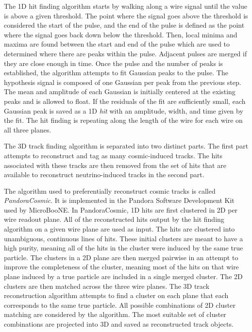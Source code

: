     The 1D hit finding algorithm starts by walking along a wire signal until
    the value is above a given threshold. The point where the signal goes above
    the threshold is considered the start of the pulse, and the end of the
    pulse is defined as the point where the signal goes back down below the
    threshold.  Then, local minima and maxima are found between the start and
    end of the pulse which are used to determined where there are peaks within
    the pulse.  Adjacent pulses are merged if they are close enough in time.
    Once the pulse and the number of peaks is established, the algorithm
    attempts to fit Gaussian peaks to the pulse. The hypothesis signal is
    composed of one Gaussian per peak from the previous step. The mean and
    amplitude of each Gaussian is initially centered at the existing peaks and
    is allowed to float. If the residuals of the fit are sufficiently small,
    each Gaussian peak is saved as a 1D \textit{hit} with an amplitude, width,
    and time given by the fit. The hit finding is repeating along the length of
    the wire for each wire on all three planes.

    The 3D track finding algorithm is separated into two distinct parts. The
    first part attempts to reconstruct and tag as many cosmic-induced tracks.
    The hits associated with these tracks are then removed from the set of hits
    that are available to reconstruct neutrino-induced tracks in the second
    part. 

    The algorithm used to preferentially reconstruct cosmic tracks is called
    \textit{PandoraCosmic}. It is implemented in the Pandora Software
    Development Kit~\cite{Pandora} used by MicroBooNE. In PandoraCosmic, 1D
    hits are first clustered in 2D per wire readout plane. All of the
    reconstructed hits output by the hit finding algorithm on a given wire
    plane are used as input. The hits are clustered into unambiguous,
    continuous lines of hits. These initial clusters are meant to have a high
    purity, meaning all of the hits in the cluster were induced by the same
    true particle. The clusters in a 2D plane are then merged pairwise in an
    attempt to improve the completeness of the cluster, meaning most of the
    hits on that wire plane induced by a true particle are included in a single
    merged cluster. The 2D clusters are then matched across the three wire
    planes. The 3D track reconstruction algorithm attempts to find a cluster on
    each plane that each corresponds to the same true particle. All possible
    combinations of 2D cluster matching are considered by the algorithm. The
    most suitable set of cluster combinations are projected into 3D and saved
    as reconstructed track objects.

